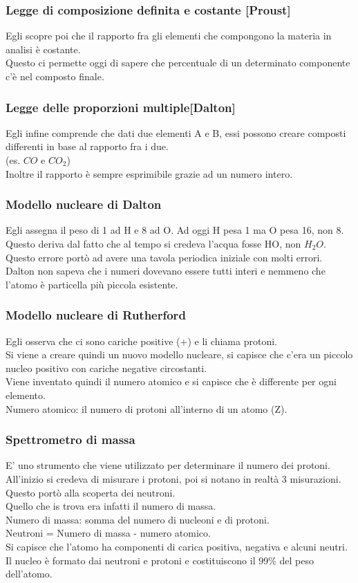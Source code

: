\subsubsection{Legge di composizione definita e costante [Proust]}
Egli scopre poi che il rapporto fra gli elementi che compongono la materia in analisi è costante.\\
Questo ci permette oggi di sapere che percentuale di un determinato componente c'è nel composto finale.
\subsubsection{Legge delle proporzioni multiple[Dalton]}
Egli infine comprende che dati due elementi A e B, essi possono creare composti differenti in base al rapporto fra i due.\\
(es. $CO$ e $CO_2$)\\
Inoltre il rapporto è sempre esprimibile grazie ad un numero intero.
\subsubsection{Modello nucleare di Dalton}
Egli assegna il peso di 1 ad H e 8 ad O. Ad oggi H pesa 1 ma O pesa 16, non 8. Questo deriva dal fatto che al tempo si credeva l'acqua fosse HO, non $H_2O$.\\
Questo errore portò ad avere una tavola periodica iniziale con molti errori.\\
Dalton non sapeva che i numeri dovevano essere tutti interi e nemmeno che l'atomo è particella più piccola esistente.
\subsubsection{Modello nucleare di Rutherford}
Egli osserva che ci sono cariche positive (+) e li chiama protoni.\\
Si viene a creare quindi un nuovo modello nucleare, si capisce che c'era un piccolo nucleo positivo con cariche negative circostanti.\\
Viene inventato quindi il numero atomico e si capisce che è differente per ogni elemento.\\
Numero atomico: il numero di protoni all'interno di un atomo (Z).
\subsubsection{Spettrometro di massa}
E' uno strumento che viene utilizzato per determinare il numero dei protoni.\\
All'inizio si credeva di misurare i protoni, poi si notano in realtà 3 misurazioni. Questo portò alla scoperta dei neutroni.\\
Quello che is trova era infatti il numero di massa.\\
Numero di massa: somma del numero di nucleoni e di protoni.\\
Neutroni = Numero di massa - numero atomico.\\
Si capisce che l'atomo ha componenti di carica positiva, negativa e alcuni neutri. Il nucleo è formato dai neutroni e protoni e costituiscono il 99\% del peso dell'atomo.
